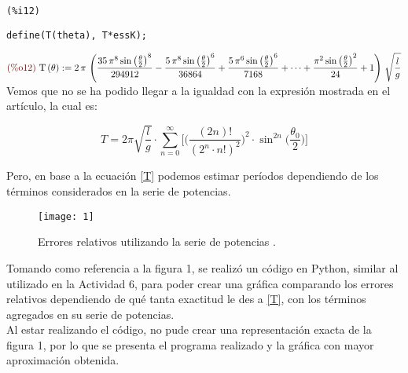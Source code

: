 \documentclass[12pt]{article}
\begin{document}
\noindent
\begin{minipage}[t]{8ex}{\color{red}\bf
\begin{verbatim}
(%i12) 
\end{verbatim}}
\end{minipage}
\begin{minipage}[t]{\textwidth}{\color{blue}
\begin{verbatim}
define(T(theta), T*essK);
\end{verbatim}}
\end{minipage}
\begin{math}\displaystyle
\parbox{8ex}{\color{labelcolor}(\%o12) }
\mathrm{T}\left( \theta\right) :=2\,\pi \,\left( \frac{35\,{\pi }^{8}\,{\mathrm{sin}\left( \frac{\theta}{2}\right) }^{8}}{294912}-\frac{5\,{\pi }^{8}\,{\mathrm{sin}\left( \frac{\theta}{2}\right) }^{6}}{36864}+\frac{5\,{\pi }^{6}\,{\mathrm{sin}\left( \frac{\theta}{2}\right) }^{6}}{7168}+\cdots+\frac{{\pi }^{2}\,{\mathrm{sin}\left( \frac{\theta}{2}\right) }^{2}}{24}+1\right) \,\sqrt{\frac{l}{g}}
\end{math} \\

Vemos que no se ha podido llegar a la igualdad con la expresión mostrada en el artículo, la cual es:

\begin{equation}
\label{T}
T=2\pi\sqrt{\frac{l}{g}} \cdot \sum_{n=0}^{\infty} \Bigg[\Bigg(\frac{(2n)!}{(2^n\cdot n!)^2} \Bigg)^2 \cdot \sin^{2n}\Bigg(\frac{\theta_0}{2}\Bigg)\Bigg]
\end{equation}

Pero, en base a la ecuación \eqref{T} podemos estimar períodos dependiendo de los términos considerados en la serie de potencias. 

\begin{figure}[H]
\centering
 \texttt{[image: 1]}
 \caption{Errores relativos utilizando la serie de potencias \cite{P}.}
\end{figure}

Tomando como referencia a la figura 1, se realizó un código en Python, similar al utilizado en la Actividad 6, para poder crear una gráfica comparando los errores relativos dependiendo de qué tanta exactitud le des a \eqref{T}, con los términos agregados en su serie de potencias. \\

Al estar realizando el código, no pude crear una representación exacta de la figura 1, por lo que se presenta el programa realizado y la gráfica con mayor aproximación obtenida.
\end{document}
